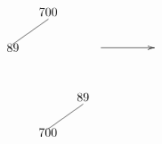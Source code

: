 \begin{minipage}{0.3\textwidth}
\[\begin{xy}
,(0,0)*+=<10mm>[]\txt<2cm>{700}
,(-10,-10)*+=<10mm>[]\txt<2cm>{89}

\ar@{->} (15,-10);(30,-10)
\ar@{-} (0,-2);(-10,-9) %
\end{xy}\]
\end{minipage}
\begin{minipage}{0.5\textwidth}
\[\begin{xy}
,(0,0)*+=<10mm>[]\txt<2cm>{89}
,(-10,-10)*+=<10mm>[]\txt<2cm>{700}

\ar@{-} (0,-2);(-10,-9) %
\end{xy}\]
\end{minipage}
